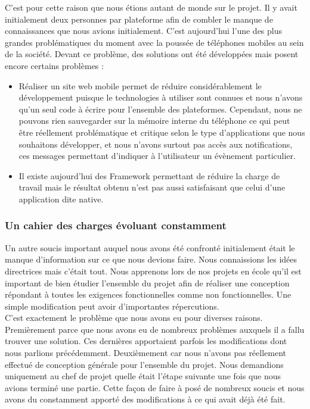 \documentclass{article}
\begin{document}
		C'est pour cette raison que nous étions autant de monde sur le projet. Il y avait initialement deux personnes par plateforme afin de combler le manque de connaissances que nous avions initialement.  C'est aujourd'hui l'une des plus grandes problématiques du moment avec la poussée de téléphones mobiles au sein de la société. Devant ce problème, des solutions ont été développées mais posent encore certains problèmes : 
		\begin{itemize}
			\item Réaliser un site web mobile permet de réduire considérablement le développement puisque le technologies à utiliser sont connues et nous n'avons qu'un seul code à écrire pour l'ensemble des plateformes. Cependant, nous ne pouvons rien sauvegarder sur la mémoire interne du téléphone ce qui peut être réellement problématique et critique selon le type d'applications que nous souhaitons développer, et nous n'avons surtout pas accès aux notifications, ces messages permettant d'indiquer à l'utilisateur un évènement particulier. 
			\item Il existe aujourd'hui des Framework permettant de réduire la charge de travail mais le résultat obtenu n'est pas aussi satisfaisant que celui d'une application dite native.
		\end{itemize}
\subsubsection{Un cahier des charges évoluant constamment}
		Un autre soucis important auquel nous avons été confronté initialement était le manque d'information sur ce que nous devions faire. Nous connaissions les idées directrices mais c'était tout. Nous apprenons lors de nos projets en école qu'il est important de bien étudier l'ensemble du projet afin de réaliser une conception répondant à toutes les exigences fonctionnelles comme non fonctionnelles. Une simple modification peut avoir d'importantes répercutions. \\
			
		C'est exactement le problème que nous avons eu pour diverses raisons. Premièrement parce que nous avons eu de nombreux problèmes auxquels il a fallu trouver une solution. Ces dernières apportaient parfois les modifications dont nous parlions précédemment. Deuxièmement car nous n'avons pas réellement effectué de conception générale pour l'ensemble du projet. Nous demandions uniquement au chef de projet quelle était l'étape suivante une fois que nous avions terminé une partie. Cette façon de faire à posé de nombreux soucis et nous avons du constamment apporté des modifications à ce qui avait déjà été fait.\\
		
\end{document}
